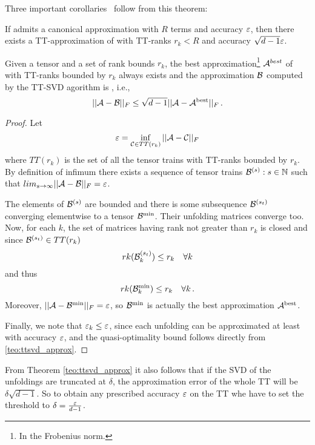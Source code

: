 Three important corollaries~\cite{oseledets2011tt} follow from this theorem:
\begin{Cor}
  If \A admits a canonical approximation with $R$ terms and accuracy $\varepsilon$, then there exists a TT-approximation of \A with TT-ranks $r_k < R$ and accuracy $\sqrt{d-1} \varepsilon$.
\end{Cor}
\begin{Cor}
  Given a tensor \A and a set of rank bounds $r_k$, the best approximation\footnote{In the Frobenius norm.} $\mathcal{A}^{best}$ of \A with TT-ranks bounded by $r_k$ always exists and the approximation $\mathcal{B}$ computed by the TT-SVD agorithm is , i.e.,
  \begin{equation*}
    ||\mathcal{A} - \mathcal{B}||_F \le \sqrt{d-1} ||\mathcal{A} - \mathcal{A}^{\rm best}||_F\, .
  \end{equation*}

  \begin{proof}
    Let
    \begin{equation*}
     \varepsilon = \inf_{\mathcal{C} \in TT(r_k)} ||\mathcal{A} - \mathcal{C}||_F
    \end{equation*}
    where $TT(r_k)$ is the set of all the tensor trains with TT-ranks bounded by $r_k$. By definition of infimum there exists a sequence of tensor trains $\mathcal{B}^{(s)} : s \in \mathbb{N}$ such that $lim_{s\to\infty} ||\mathcal{A} - \mathcal{B}||_F = \varepsilon$.

    The elements of $\mathcal{B}^{(s)}$ are bounded and there is some subsequence $\mathcal{B}^{(s_t)}$ converging elementwise to a tensor $\mathcal{B}^{\rm min}$. Their unfolding matrices converge too. Now, for each $k$, the set of matrices having rank not greater than $r_k$ is closed and since $\mathcal{B}^{(s_t)} \in TT(r_k)$
    \begin{equation*}
      rk(\mathcal{B}^{(s_t)}_k) \le r_k \quad \forall k
    \end{equation*}
    and thus
    \begin{equation*}
      rk(\mathcal{B}^{\rm min}_k) \le r_k \quad \forall k\, .
    \end{equation*}
    Moreover, $||\mathcal{A} - \mathcal{B}^{\rm min}||_F = \varepsilon$, so $\mathcal{B}^{\rm min}$ is actually the best approximation $\mathcal{A}^{\rm best}$.

    Finally, we note that $\varepsilon_k \le \varepsilon$, since each unfolding can be approximated at least with accuracy $\varepsilon$, and the quasi-optimality bound follows directly from \ref{teo:ttsvd_approx}.
  \end{proof}
\end{Cor}

\begin{Cor} \label{cor:tt_tsvd_error}
  From Theorem \ref{teo:ttsvd_approx} it also follows that if the SVD of the unfoldings are truncated at $\delta$, the approximation error of the whole TT will be $\delta \sqrt{d-1}$. So to obtain any prescribed accuracy $\varepsilon$ on the TT whe have to set the threshold to $\delta = \frac{\varepsilon}{d-1}$.
\end{Cor}

